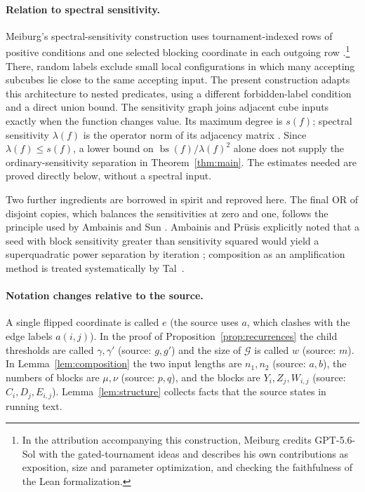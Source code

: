 \documentclass[11pt]{article}
\newcommand{\bs}{\operatorname{bs}}
\theoremstyle{definition}
\theoremstyle{remark}
\begin{document}
\paragraph{Relation to spectral sensitivity.}
Meiburg's spectral-sensitivity construction uses tournament-indexed rows
of positive conditions and one selected blocking coordinate in each
outgoing row \cite[Sections~3.1 and~5.2--5.5]{Meiburg2026}.\footnote{In the
attribution accompanying this construction, Meiburg credits GPT-5.6-Sol
with the gated-tournament ideas and describes his own contributions as
exposition, size and parameter optimization, and checking the faithfulness
of the Lean formalization.}
There, random labels exclude small local configurations in which many accepting
subcubes lie close to the same accepting input. The present construction adapts this
architecture to nested predicates, using a different forbidden-label condition
and a direct union bound.
The sensitivity graph joins adjacent cube inputs exactly when the function
changes value. Its maximum degree is \(s(f)\); spectral sensitivity
\(\lambda(f)\) is the operator norm of its adjacency matrix
\cite{AaronsonEtAl2021}.
Since \(\lambda(f)\le s(f)\), a lower bound on
\(\bs(f)/\lambda(f)^2\) alone does not supply the ordinary-sensitivity
separation in Theorem~\ref{thm:main}. The estimates needed are proved directly
below, without a spectral input.

Two further ingredients are borrowed in spirit and reproved here. The final
OR of disjoint copies, which balances the sensitivities at zero and one, follows the principle used by
Ambainis and Sun \cite[Section~4, Lemma~1]{AmbainisSun2011}.
Ambainis and Pr\={u}sis explicitly noted that a seed with block sensitivity
greater than sensitivity squared would yield a superquadratic power separation
by iteration \cite[Section~1]{AmbainisPrusis2014}; composition as an
amplification method is treated systematically by Tal~\cite{Tal2013}.

\paragraph{Notation changes relative to the source.}
A single flipped coordinate is called \(e\) (the source uses \(a\), which
clashes with the edge labels \(a(i,j)\)). In the proof of
Proposition~\ref{prop:recurrences} the child thresholds are called
\(\gamma,\gamma'\) (source: \(g,g'\)) and the size of \(\mathcal G\) is called
\(w\) (source: \(m\)). In Lemma~\ref{lem:composition} the two input lengths are
\(n_1,n_2\) (source: \(a,b\)), the numbers of blocks are \(\mu,\nu\) (source:
\(p,q\)), and the blocks are \(Y_i,Z_j,W_{i,j}\) (source: \(C_i,D_j,E_{i,j}\)).
Lemma~\ref{lem:structure} collects facts that the source states in running text.
\end{document}
